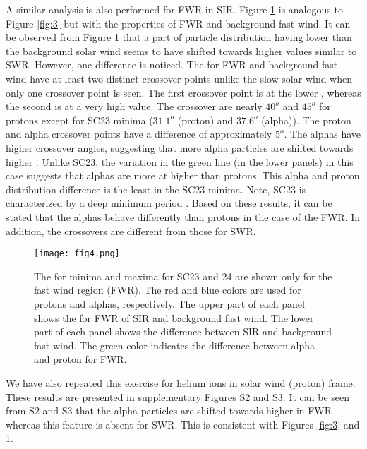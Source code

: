 \documentclass[letters,usenatbib]{mnras}
\begin{document}
A similar analysis is also performed for FWR in SIR. Figure \ref{fig:4} is analogous to Figure \ref{fig:3} but with the properties of FWR and background fast wind. It can be observed from Figure \ref{fig:4} that a part of particle distribution having lower  than the background solar wind seems to have shifted towards higher values similar to SWR. However, one difference is noticed. The  for FWR and background fast wind have at least two distinct crossover points unlike the slow solar wind when only one crossover point is seen. The first crossover point is at the lower , whereas the second is at a very high value. The crossover  are nearly $40^o$ and $45^o$ for protons except for SC23 minima ($31.1^o$ (proton) and $37.6^o$ (alpha)). The proton and alpha  crossover points have a difference of approximately $5^o$. The alphas have higher crossover angles, suggesting that more alpha particles are shifted towards higher . Unlike SC23, the variation in the green line (in the lower panels) in this case suggests that alphas are more at higher  than protons. This alpha and proton distribution difference is the least in the SC23 minima. Note, SC23 is characterized by a deep minimum period \citep{Hathaway2015}.  Based on these results, it can be stated that the alphas behave differently than protons in the case of the FWR. In addition, the  crossovers are different from those for SWR.  	

\begin{figure}
\begin{center}
\texttt{[image: fig4.png]}
\caption{The  for minima and maxima for SC23 and 24 are shown only for the fast wind region (FWR). The red and blue colors are used for protons and alphas, respectively. The upper part of each panel shows the  for FWR of SIR and background fast wind. The lower part of each panel shows the difference between SIR  and background fast wind. The green color indicates the difference between alpha and proton  for FWR.      \label{fig:4}}

\end{center}
\end{figure}

We have also repeated this exercise for helium ions in solar wind (proton) frame. These results are presented in supplementary Figures S2 and S3. It can be seen from S2 and S3 that the alpha particles are shifted towards higher  in FWR whereas this feature is absent for SWR. This is consistent with Figures \ref{fig:3} and \ref{fig:4}.  
\end{document}

